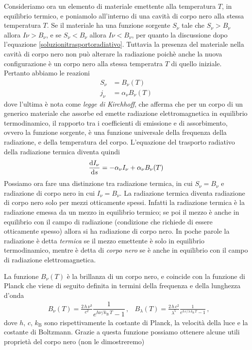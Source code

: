 Consideriamo ora un elemento di materiale emettente alla temperatura $T$, in equilibrio termico, e poniamolo all'interno di una cavità di corpo nero alla stessa temperatura $T$. Se il materiale ha una funzione sorgente $S_\nu$ tale che $S_\nu>B_\nu$ allora $I\nu>B_\nu$, e se $S_\nu<B_\nu$ allora $I\nu<B_\nu$, per quanto la discussione dopo l'equazione \ref{soluzionitrasportoradiativo}. Tuttavia la presenza del materiale nella cavità di corpo nero non può alterare la radiazione poichè anche la nuova configurazione è un corpo nero alla stessa temperatra $T$ di quello iniziale. Pertanto abbiamo le reazioni
\begin{align}
S_\nu &= B_\nu(T) \\
j_\nu &= \alpha_\nu B_\nu(T) \label{eq:Kirchhoff}
\end{align}
dove l'ultima è nota come \textit{legge di Kirchhoff}, che afferma che per un corpo di un generico materiale che assorbe ed emette radiazione elettromagnetica in equilibrio termodinamico, il rapporto tra i coefficienti di emissione e di assorbimento, ovvero la funzione sorgente, è una funzione universale della frequenza della radiazione, e della temperatura del corpo. 
L'equazione del trasporto radiativo della radiazione termica diventa quindi
\begin{equation}
\dfrac{\mathrm{d} {I_\nu}}{\mathrm{d} {s}} = -\alpha_\nu I_\nu + \alpha_\nu B_\nu(T)
\end{equation}
Possiamo ora fare una distinzione tra radiazione termica, in cui $S_\nu=B_\nu$ e radiazione di corpo nero in cui $I_\nu=B_\nu$. La radiazione termica diventa radiazione di corpo nero solo per mezzi otticamente spessi. Infatti la radiazione termica è la radiazione emessa da un mezzo in equilibrio termico; se poi il mezzo è anche in equilibrio con il campo di radiazione (condizione che richiede di essere otticamente spesso) allora si ha radiazione di corpo nero. In poche parole la radiazione è detta \textit{termica} se il mezzo emettente è solo in equilibrio termodinamico, mentre è detta di \textit{corpo nero} se è anche in equilibrio con il campo di radiazione elettromagnetica.

La funzione $B_{\nu}(T)$ è la brillanza di un corpo nero, e coincide con la funzione di Planck che viene di seguito definita in termini della frequenza e della lunghezza d'onda
\begin{align}
&B_{\nu}(T)=\frac{2\,h\,\nu^3}{c^2}\dfrac{1}{e^{{h\nu}/{k_\mathrm{B}\,T}}-1}\, ,
&B_{\lambda}(T)=\frac{2\,h\,c^2}{\lambda^5}\frac{1}{e^{{h\,c}/{\lambda\,k_\mathrm{B}\,T}}-1}\, ,
\end{align}
dove $h$, $c$, $k_\mathrm{B}$ sono rispettivamente la costante di Planck, la velocità della luce e la costante di Boltzmann. Grazie a questa funzione possiamo ottenere alcune utili proprietà del corpo nero (non le dimostreremo)

